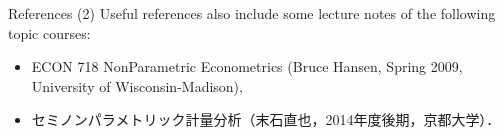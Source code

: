 \documentclass[xcolor=svgnames,dvipdfmx,cjk]{beamer}
\theoremstyle{example}
\begin{document}
\begin{frame}{References (2)}
\quad 
Useful references also include some lecture notes of the following topic courses:
  \begin{itemize}
    \item ECON 718 NonParametric Econometrics (Bruce Hansen, Spring 2009, University of Wisconsin-Madison),
    \item セミノンパラメトリック計量分析（末石直也，2014年度後期，京都大学）．
  \end{itemize}
\end{frame}
\end{document}

